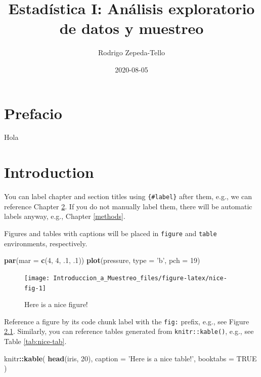 \documentclass[
]{book}
\title{Estadística I: Análisis exploratorio de datos y muestreo}
\author{Rodrigo Zepeda-Tello}
\date{2020-08-05}
\newenvironment{Shaded}{\begin{snugshade}}{\end{snugshade}}
\newcommand{\DataTypeTok}[1]{\textcolor[rgb]{0.13,0.29,0.53}{#1}}
\newcommand{\DecValTok}[1]{\textcolor[rgb]{0.00,0.00,0.81}{#1}}
\newcommand{\FloatTok}[1]{\textcolor[rgb]{0.00,0.00,0.81}{#1}}
\newcommand{\KeywordTok}[1]{\textcolor[rgb]{0.13,0.29,0.53}{\textbf{#1}}}
\newcommand{\NormalTok}[1]{#1}
\newcommand{\OperatorTok}[1]{\textcolor[rgb]{0.81,0.36,0.00}{\textbf{#1}}}
\newcommand{\OtherTok}[1]{\textcolor[rgb]{0.56,0.35,0.01}{#1}}
\newcommand{\StringTok}[1]{\textcolor[rgb]{0.31,0.60,0.02}{#1}}
\begin{document}
\maketitle

{
\setcounter{tocdepth}{1}
\tableofcontents
}
\hypertarget{prefacio}{%
\chapter{Prefacio}\label{prefacio}}

Hola

\hypertarget{intro}{%
\chapter{Introduction}\label{intro}}

You can label chapter and section titles using \texttt{\{\#label\}} after them, e.g., we can reference Chapter \ref{intro}. If you do not manually label them, there will be automatic labels anyway, e.g., Chapter \ref{methods}.

Figures and tables with captions will be placed in \texttt{figure} and \texttt{table} environments, respectively.

\begin{Shaded}
\begin{Highlighting}[]
\KeywordTok{par}\NormalTok{(}\DataTypeTok{mar =} \KeywordTok{c}\NormalTok{(}\DecValTok{4}\NormalTok{, }\DecValTok{4}\NormalTok{, }\FloatTok{.1}\NormalTok{, }\FloatTok{.1}\NormalTok{))}
\KeywordTok{plot}\NormalTok{(pressure, }\DataTypeTok{type =} \StringTok{'b'}\NormalTok{, }\DataTypeTok{pch =} \DecValTok{19}\NormalTok{)}
\end{Highlighting}
\end{Shaded}

\begin{figure}

{\centering \texttt{[image: Introduccion\_a\_Muestreo\_files/figure-latex/nice-fig-1]} 

}

\caption{Here is a nice figure!}\label{fig:nice-fig}
\end{figure}

Reference a figure by its code chunk label with the \texttt{fig:} prefix, e.g., see Figure \ref{fig:nice-fig}. Similarly, you can reference tables generated from \texttt{knitr::kable()}, e.g., see Table \ref{tab:nice-tab}.

\begin{Shaded}
\begin{Highlighting}[]
\NormalTok{knitr}\OperatorTok{::}\KeywordTok{kable}\NormalTok{(}
  \KeywordTok{head}\NormalTok{(iris, }\DecValTok{20}\NormalTok{), }\DataTypeTok{caption =} \StringTok{'Here is a nice table!'}\NormalTok{,}
  \DataTypeTok{booktabs =} \OtherTok{TRUE}
\NormalTok{)}
\end{Highlighting}
\end{Shaded}
\end{document}
